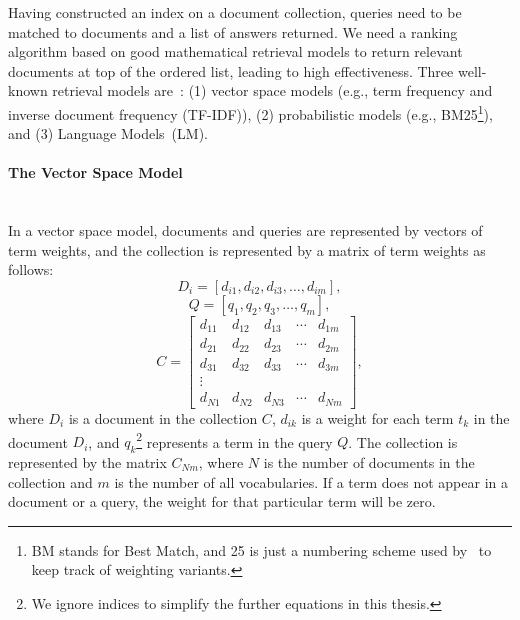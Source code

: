 Having constructed an index on a document collection, queries need to 
be matched to documents and a list of answers returned. We need a ranking algorithm based on good mathematical retrieval models to 
return relevant documents at top of the ordered list, leading to high effectiveness. 
Three well-known retrieval models are~\citep{croft2010search}: (1) vector space models (e.g., term frequency and inverse document frequency (TF-IDF)), (2) probabilistic models (e.g., BM25\footnote{BM stands for Best Match, and 25 is just a numbering scheme used by~\cite{robertson1994some} to keep track of weighting variants.}), and (3) Language Models~(LM). 

\paragraph{The Vector Space Model}
\ \\
In a vector space model, documents and queries are represented by vectors of term weights, and the collection is represented by a matrix of term weights as follows: 
\begin{displaymath} 
D_{i}=[d_{i1}, d_{i2}, d_{i3}, \ldots , d_{im}],
\end{displaymath}
\begin{displaymath} 
Q=[q_{1}, q_{2}, q_{3}, \ldots , q_{m}],
\end{displaymath}
\begin{displaymath} 
C=
\begin{bmatrix}
        d_{11} & d_{12} & d_{13} & \cdots & d_{1m}\\
        d_{21} & d_{22} & d_{23} & \cdots & d_{2m}\\
        d_{31} & d_{32} & d_{33} & \cdots & d_{3m}\\
        \vdots\\
        d_{N1} & d_{N2} & d_{N3} & \cdots & d_{Nm}
     \end{bmatrix},
\end{displaymath}
\noindent
where $ D_{i} $ is a document in the collection $ C $, $ d_{ik} $ is a weight for each term $ t_{k} $ in the document $ D_{i} $, and $ q_{k} $\footnote{We ignore indices to simplify the further equations in this thesis.} represents a term in the query $ Q $. The collection is represented by the matrix $C_{Nm}$, where $N$ is the number of documents in the collection and $m$ is the number of all vocabularies. If a term does not appear in a document or a query, the weight for that particular term will be zero. 

